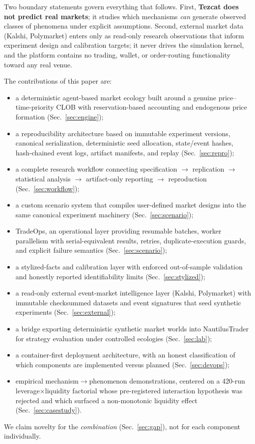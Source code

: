 \documentclass[conference]{IEEEtran}
\newcommand{\tez}{Tezcat}
\begin{document}
Two boundary statements govern everything that follows. First,
\textbf{\tez{} does not predict real markets}; it studies which
mechanisms \emph{can} generate observed classes of phenomena under
explicit assumptions. Second, external market data (Kalshi, Polymarket)
enters only as read-only research observations that inform experiment
design and calibration targets; it never drives the simulation kernel,
and the platform contains no trading, wallet, or order-routing
functionality toward any real venue.

The contributions of this paper are:
\begin{itemize}
\item[\textbf{C1}] a deterministic agent-based market ecology built
around a genuine price--time-priority CLOB with reservation-based
accounting and endogenous price formation (Sec.~\ref{sec:engine});
\item[\textbf{C2}] a reproducibility architecture based on immutable
experiment versions, canonical serialization, deterministic seed
allocation, state/event hashes, hash-chained event logs, artifact
manifests, and replay (Sec.~\ref{sec:repro});
\item[\textbf{C3}] a complete research workflow connecting
specification $\rightarrow$ replication $\rightarrow$ statistical
analysis $\rightarrow$ artifact-only reporting $\rightarrow$
reproduction (Sec.~\ref{sec:workflow});
\item[\textbf{C4}] a custom scenario system that compiles user-defined
market designs into the same canonical experiment machinery
(Sec.~\ref{sec:scenario});
\item[\textbf{C5}] TradeOps, an operational layer providing resumable
batches, worker parallelism with serial-equivalent results, retries,
duplicate-execution guards, and explicit failure semantics
(Sec.~\ref{sec:scenario});
\item[\textbf{C6}] a stylized-facts and calibration layer with enforced
out-of-sample validation and honestly reported identifiability limits
(Sec.~\ref{sec:stylized});
\item[\textbf{C7}] a read-only external event-market intelligence layer
(Kalshi, Polymarket) with immutable checksummed datasets and event
signatures that seed synthetic experiments (Sec.~\ref{sec:external});
\item[\textbf{C8}] a bridge exporting deterministic synthetic market
worlds into NautilusTrader for strategy evaluation under controlled
ecologies (Sec.~\ref{sec:lab});
\item[\textbf{C9}] a container-first deployment architecture, with an
honest classification of which components are implemented versus
planned (Sec.~\ref{sec:devops});
\item[\textbf{C10}] empirical mechanism$\rightarrow$phenomenon
demonstrations, centered on a 420-run leverage$\times$liquidity
factorial whose pre-registered interaction hypothesis was rejected and
which surfaced a non-monotonic liquidity effect
(Sec.~\ref{sec:casestudy}).
\end{itemize}
We claim novelty for the \emph{combination} (Sec.~\ref{sec:gap}), not
for each component individually.
\end{document}
